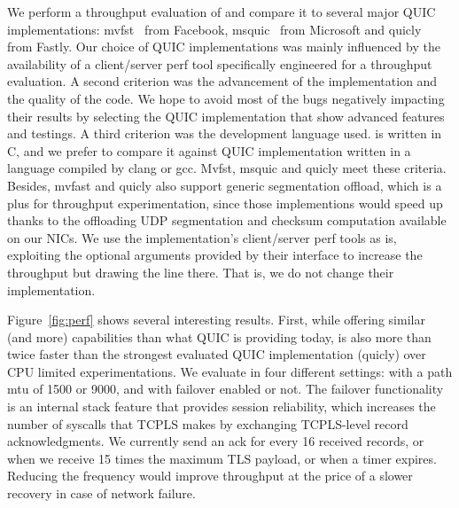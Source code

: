 We perform a throughput evaluation of \tcpls and compare it to several major
QUIC implementations: mvfst~\cite{} from Facebook, msquic~\cite{} from Microsoft
and quicly~\cite{} from Fastly. Our choice of QUIC implementations was mainly
influenced by the availability of a client/server perf tool specifically
engineered for a throughput evaluation. A second criterion was the advancement
of the implementation and the quality of the code. We hope to avoid most of the
bugs negatively impacting their results by selecting the QUIC implementation
that show advanced features and testings. A third criterion was the development
language used. \tcpls is written in C, and we prefer to compare it against QUIC
implementation written in a language compiled by clang or gcc. Mvfst, msquic
and quicly meet these criteria. Besides, mvfast and quicly also support generic
segmentation offload, which is a plus for throughput experimentation, since those
implementions would speed up thanks to the offloading UDP segmentation and
checksum computation available on our NICs. We use the implementation's
client/server perf tools as is, exploiting the optional arguments provided
by their interface to increase the throughput but drawing the line there. That
is, we do not change their implementation.

Figure~\ref{fig:perf} shows several interesting results. First, while
offering similar (and more) capabilities than what QUIC is providing today,
\tcpls is also more than twice faster than the strongest evaluated QUIC
implementation (quicly) over CPU limited experimentations. We evaluate \tcpls
in four different settings: with a path mtu of 1500 or 9000, and with failover
enabled or not. The failover functionality is an internal stack feature that
provides session reliability, which increases the number of syscalls that TCPLS
makes by exchanging TCPLS-level record acknowledgments. We currently send an ack
for every 16 received records, or when we receive 15 times the maximum TLS
payload, or when a timer expires. Reducing the frequency would improve
throughput at the price of a slower recovery in case of network failure.

